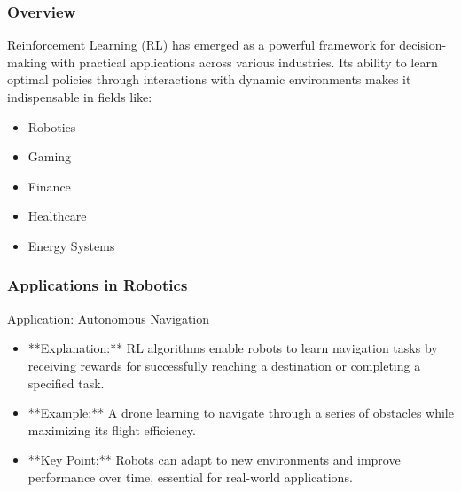 \documentclass[aspectratio=169]{beamer}
\begin{document}
\begin{frame}[fragile]
    \frametitle{Overview}
    Reinforcement Learning (RL) has emerged as a powerful framework for decision-making with practical applications across various industries. Its ability to learn optimal policies through interactions with dynamic environments makes it indispensable in fields like:
    \begin{itemize}
        \item Robotics
        \item Gaming
        \item Finance
        \item Healthcare
        \item Energy Systems
    \end{itemize}
\end{frame}

\begin{frame}[fragile]
    \frametitle{Applications in Robotics}
    \begin{block}{Application: Autonomous Navigation}
        \begin{itemize}
            \item **Explanation:** RL algorithms enable robots to learn navigation tasks by receiving rewards for successfully reaching a destination or completing a specified task.
            \item **Example:** A drone learning to navigate through a series of obstacles while maximizing its flight efficiency.
            \item **Key Point:** Robots can adapt to new environments and improve performance over time, essential for real-world applications.
        \end{itemize}
    \end{block}
\end{frame}
\end{document}
